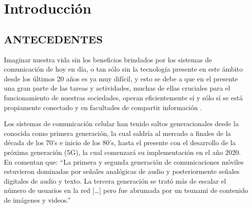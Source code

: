 
\chapter{Introducción} %

\label{Chapter1} %


\newcommand{\keyword}[1]{\textbf{#1}}
\newcommand{\tabhead}[1]{\textbf{#1}}
\newcommand{\code}[1]{\texttt{#1}}
\newcommand{\file}[1]{\texttt{\bfseries#1}}
\newcommand{\option}[1]{\texttt{\itshape#1}}



\section{ANTECEDENTES}

Imaginar nuestra vida sin los beneficios brindados por los sistemas de comunicación de hoy en día, o tan sólo sin la tecnología presente en este ámbito desde los últimos 20 años es ya muy difícil, y esto se debe a que en el presente una gran parte de las tareas y actividades, muchas de ellas cruciales para el funcionamiento de nuestras sociedades, operan eficientemente sí y sólo sí se está propiamente conectado y en facultades de compartir información \parencite{Fettweis2014}.\newline

Los sistemas de comunicación celular han tenido saltos generacionales desde la conocida como primera generación, la cual saldría al mercado a finales de la década de los 70’s e inicio de los 80’s, hasta el presente con el desarrollo de la próxima generación (5G), la cual comenzará su implementación en el año 2020. En \parencite{Fettweis2014} comentan que: “La primera y segunda generación de comunicaciones móviles estuvieron dominadas por señales analógicas de audio y posteriormente señales digitales de audio y texto. La tercera generación se trató más de escalar el número de usuarios en la red […] pero fue abrumada por un tsunami de contenido de imágenes y videos.”\newline


